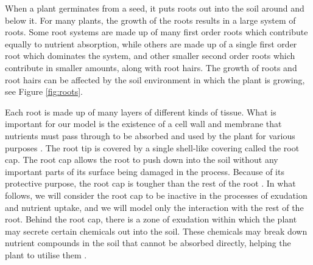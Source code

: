 \documentclass[11pt]{article}
\numberwithin{equation}{section}
\begin{document}
When a plant germinates from a seed, it puts roots out into the soil around and below it. For many plants, the growth of the roots results in a large system of roots.
Some root systems are made up of many first order roots which contribute equally to nutrient absorption, while others are made up of a single first order root which dominates the system, and other smaller second order roots which contribute in smaller amounts, along with root hairs. 
The growth of roots and root hairs can be affected by the soil environment in which the plant is growing, see Figure \ref{fig:roots}.

Each root is made up of many layers of different kinds of tissue. What is important for our model is the existence of a cell wall and membrane that nutrients must pass through to be absorbed and used by the plant for various purposes \cite{PALLARDY2008255}. The root tip is covered by a single shell-like covering called the root cap. The root cap allows the root to push down into the soil without any important parts of its surface being damaged in the process. Because of its protective purpose, the root cap is tougher than the rest of the root \cite{haberlandt1914}. In what follows, we will consider the root cap to be inactive in the processes of exudation and nutrient uptake, and we will model only the interaction with the rest of the root.
Behind the root cap, there is a zone of exudation within which the plant may secrete certain chemicals out into the soil. These chemicals may break down nutrient compounds in the soil that cannot be absorbed directly, helping the plant to utilise them \cite{10.3389/fpls.2019.00157}.
\end{document}
